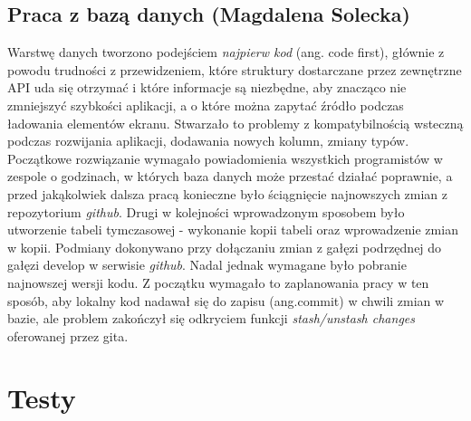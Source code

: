 \documentclass[10pt,twoside,a4paper]{report}
\begin{document}
\section{Praca z bazą danych (Magdalena Solecka)}
\par Warstwę danych tworzono podejściem \textit{najpierw kod} (ang. code first), głównie z powodu trudności z przewidzeniem, które struktury dostarczane przez zewnętrzne API uda się otrzymać i które informacje są niezbędne, aby znacząco nie zmniejszyć szybkości aplikacji, a o które można zapytać źródło podczas ładowania elementów ekranu. Stwarzało to problemy z kompatybilnością wsteczną podczas rozwijania aplikacji, dodawania nowych kolumn, zmiany typów. Początkowe rozwiązanie wymagało powiadomienia wszystkich programistów w zespole o godzinach, w których baza danych może przestać działać poprawnie, a przed jakąkolwiek dalsza pracą konieczne było ściągnięcie najnowszych zmian z repozytorium \textit{github}. Drugi w kolejności wprowadzonym sposobem było utworzenie tabeli tymczasowej - wykonanie kopii tabeli oraz wprowadzenie zmian w kopii. Podmiany dokonywano przy dołączaniu zmian z gałęzi podrzędnej do gałęzi develop w serwisie \textit{github}. Nadal jednak wymagane było pobranie najnowszej wersji kodu. Z początku wymagało to zaplanowania pracy w ten sposób, aby lokalny kod nadawał się do zapisu (ang.commit) w chwili zmian w bazie, ale problem zakończył się odkryciem funkcji \textit{stash/unstash changes} oferowanej przez gita.

\chapter{Testy}
\end{document}
